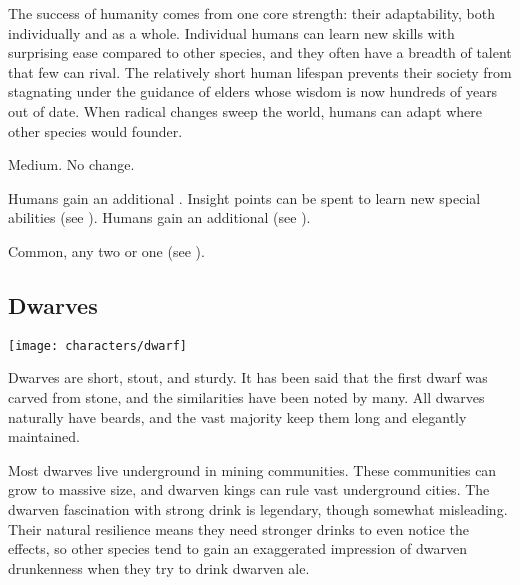         The success of humanity comes from one core strength: their adaptability, both individually and as a whole.
        Individual humans can learn new skills with surprising ease compared to other species, and they often have a breadth of talent that few can rival.
        The relatively short human lifespan prevents their society from stagnating under the guidance of elders whose wisdom is now hundreds of years out of date.
        When radical changes sweep the world, humans can adapt where other species would founder.

         Medium.
         No change.
        \begin{raggeditemize}
             Humans gain an additional .
                Insight points can be spent to learn new special abilities (see ).
             Humans gain an additional  (see ).
        \end{raggeditemize}
         Common, any two  or one  (see ).

    \subsection{Dwarves}
        \texttt{[image: characters/dwarf]}

        Dwarves are short, stout, and sturdy.
        It has been said that the first dwarf was carved from stone, and the similarities have been noted by many.
        All dwarves naturally have beards, and the vast majority keep them long and elegantly maintained.

        Most dwarves live underground in mining communities.
        These communities can grow to massive size, and dwarven kings can rule vast underground cities.
        The dwarven fascination with strong drink is legendary, though somewhat misleading.
        Their natural resilience means they need stronger drinks to even notice the effects, so other species tend to gain an exaggerated impression of dwarven drunkenness when they try to drink dwarven ale.

